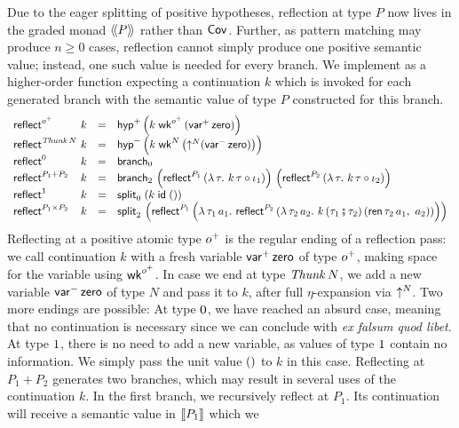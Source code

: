 \documentclass[a4paper,USenglish,cleveref, autoref]{lipics-v2019}
\begin{document}
Due to the eager splitting of positive hypotheses, reflection at type $P$
now lives in the graded monad $\langle\!\langle P \rangle\!\rangle$ rather than $\mathsf{Cov}^{}$.  Further,
as pattern matching may produce $n \geq 0$ cases, reflection cannot simply
produce one positive semantic value; instead, one such value is needed
for every branch.  We implement
as a higher-order function expecting a continuation $k$ which is
invoked for each generated branch with the semantic value of type $P$
constructed for this branch.
\[
\begin{array}{l@{~}lcl}
  \reflect {\patom} & k & = &
    \phyp \left( k\;\twk^{\patom}\,(\pvar\,\tzero) \right) \\
  \reflect {\Thunk N} & k & = &
    \nhyp \left( k\;\twk^N \left( \up N (\nvar\,\tzero) \right) \right)\\
  \reflect {\tyzero} & k & = & \nbranch \\
  \reflect {P_1 + P_2} & k & = & \bbranch
    \,\left( \treflect^{P_1}\,(\lambda\,\tau. \ k\,\tau \comp \iota_1) \right)
    \,\left( \treflect^{P_2}\,(\lambda\,\tau. \ k\,\tau \comp \iota_2) \right)
    \\
  \reflect{\tyone} & k & = & \nsplit\;(k\;\tid\;\ttempty) \\
  \reflect{P_1 \times P_2} & k & = & \bsplit
    \,\left(
      \treflect^{P_1} \left( \lambda\,\tau_1\,a_1. \
      \treflect^{P_2} \left( \lambda\,\tau_2\,a_2. \
        k\, (\tau_1 \rcomp \tau_2)\, (\tren\,\tau_2\,a_1, \ a_2)
        \right)
      \right)
    \right)
\end{array}
\]
Reflecting at a positive atomic type $o^+$ is the regular ending of a
reflection pass: we call continuation $k$ with a fresh variable
$\mathsf{var}^{+}\,\mathsf{zero}$ of type $o^+$, making space for the variable
using $\mathsf{wk}^{o^+}$.
In case we end at type $\mathit{Thunk}\,N$, we add a new variable
$\mathsf{var}^{-}\,\mathsf{zero}$ of type $N$ and pass it to $k$, after full
$\eta$-expansion via $\mathord{\uparrow_{}^{N}}$.  Two more endings are possible:
At type
$0$, we have reached an absurd case, meaning that no
continuation is necessary since we can conclude with
\emph{ex falsum quod libet}.
At type $1$, there is no need to add a new variable, as values
of type $1$ contain no information.  We simply pass the unit
value $()$ to $k$ in this case.
Reflecting at $P_1 + P_2$ generates two branches, which may result in
several uses of the continuation $k$.
In the first branch, we recursively reflect at $P_1$.  Its
continuation will receive a semantic value in $\mathopen{{[\kern-0.14em[}} P_1 \mathclose{{]\kern-0.14em]}}$ which we
\end{document}
